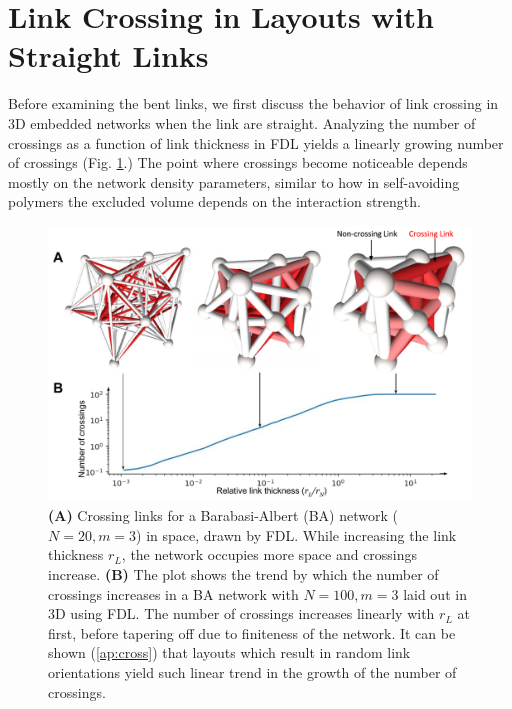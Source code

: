\documentclass[linenumbers,endfloats,nofootinbib,preprint,floatfix,titlepage,superscriptaddress]{revtex4-1} %
\newcommand{\outNim}[1]{}
\begin{document}
\section{Link Crossing in Layouts with Straight Links \label{ap:cross}}
Before examining the bent links, we first discuss the behavior of link crossing in 3D embedded networks when the link are straight. 
Analyzing the number of crossings as a function of link thickness in FDL yields a linearly growing number of crossings
\outNim{
\footnote{The exact properties of the point where the crossings start is not our primary concern here, but it seems to start at a certain nonzero thickness. 
This sharp phase transition is actually a feature of these connected networks with FDL. 
The transition disappears, as expected, in a system of randomly oriented disconnected links in 3D. 
The length scale at which this phase transition occurs is a function of some dimensionful parameter that can naturally arise from the difference in the form of the repulsive node forces and the attractive forces on the links. We did experiment adding noise to the layout and also randomly switched links around. While these changes increased the slope of the line of the crossings (generally showing more crossings than FDL) they did {\em not} move the point of the phase transition appreciably.}
}(Fig. \ref{fig:crs}.) 
The point where crossings become noticeable depends mostly on the network density parameters, similar to how in self-avoiding polymers the excluded volume depends on the interaction strength. 
\begin{figure}
    \centering
    \includegraphics[width=.7\columnwidth]{fig-09-19/3D-cross.pdf}
    \caption{\scriptsize
    {\bf (A)}  Crossing links for a Barabasi-Albert (BA) network ($N = 20, m = 3$) in space, drawn by FDL. While increasing the link thickness $r_L$, the network occupies more space and crossings increase. 
    {\bf (B)} The plot shows the trend by which the number of crossings increases in a BA network with $N=100, m =3$ laid out in 3D using FDL.
    The number of crossings increases linearly with $r_L$ at first, before tapering off due to finiteness of the network. It can be shown (\ref{ap:cross}) that layouts which result in random link orientations yield such linear trend in the growth of the number of crossings.
    }     
    \label{fig:crs}
\end{figure}
\end{document}
